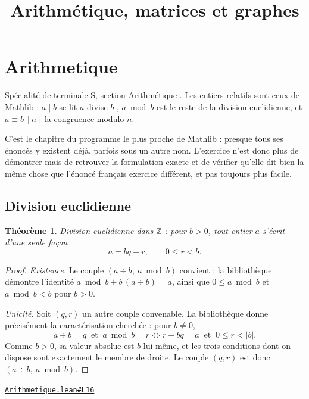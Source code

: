 \documentclass[11pt,a4paper]{article}
\title{Arithmétique, matrices et graphes}
\date{}
\theoremstyle{definition}
\theoremstyle{plain}
\newtheorem{theoreme}{Théorème}
\newcommand{\source}[2]{\par\smallskip\noindent\hfill{\footnotesize\href{#1}{\texttt{#2}}}\par\smallskip}
\begin{document}
\maketitle
\sloppy

\section{Arithmetique}

\noindent
Spécialité de terminale S, section \og{} Arithmétique \fg{}. Les entiers relatifs sont
ceux de Mathlib : $a \mid b$ se lit \og{} $a$ divise $b$ \fg{}, $a \bmod b$ est le reste de
la division euclidienne, et $a \equiv b \ [n]$ la congruence modulo $n$.

\medskip\noindent
C'est le chapitre du programme le plus proche de Mathlib : presque tous ses énoncés y
existent déjà, parfois sous un autre nom. L'exercice n'est donc plus de démontrer mais de
retrouver la formulation exacte et de vérifier qu'elle dit bien la même chose que l'énoncé
français \textemdash{} exercice différent, et pas toujours plus facile.

\subsection{Division euclidienne}

\begin{theoreme}
Division euclidienne dans $\mathbb{Z}$ : pour $b > 0$, tout entier $a$ s'écrit d'une seule
façon
\[ a = bq + r , \qquad 0 \le r < b . \]
\end{theoreme}

\begin{proof}
\emph{Existence.} Le couple $(a \div b,\ a \bmod b)$ convient : la bibliothèque démontre
l'identité $a \bmod b + b\,(a \div b) = a$, ainsi que $0 \le a \bmod b$ et
$a \bmod b < b$ pour $b > 0$.

\emph{Unicité.} Soit $(q, r)$ un autre couple convenable. La bibliothèque donne
précisément la caractérisation cherchée : pour $b \ne 0$,
\[ a \div b = q \ \text{ et } \ a \bmod b = r
   \iff r + bq = a \ \text{ et } \ 0 \le r < |b| . \]
Comme $b > 0$, sa valeur absolue est $b$ lui-même, et les trois conditions dont on dispose
sont exactement le membre de droite. Le couple $(q, r)$ est donc $(a \div b,\ a \bmod b)$.
\end{proof}
\source{https://github.com/Commutator-IO/learn-lean/blob/main/courses/02-lycee/10-specialite-mathematiques-terminale-s/Arithmetique.lean\#L16}{Arithmetique.lean\#L16}
\end{document}
